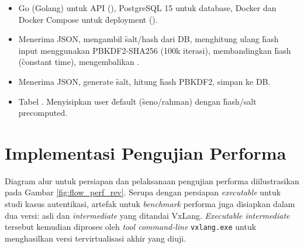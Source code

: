 \begin{itemize}
	\item {} Go (Golang) untuk API (), PostgreSQL 15 untuk database, Docker dan Docker Compose untuk \f{deployment} ().
	\item {} Menerima JSON, mengambil \f{salt/hash} dari DB, menghitung ulang \f{hash} input menggunakan PBKDF2-SHA256 (100k iterasi), membandingkan \f{hash} (\f{constant time}), mengembalikan .
	\item {} Menerima JSON, generate \f{salt}, hitung \f{hash} PBKDF2, simpan ke DB.
	\item {} Tabel . Menyisipkan user \f{default} (\f{seno}/rahman) dengan \f{hash/salt} precomputed.
\end{itemize}

\section{Implementasi Pengujian Performa}
Diagram alur untuk persiapan dan pelaksanaan pengujian performa diilustrasikan pada Gambar \ref{fig:flow_perf_rev}. Serupa dengan persiapan \textit{executable} untuk studi kasus autentikasi, artefak untuk \textit{benchmark} performa juga disiapkan dalam dua versi: asli dan \textit{intermediate} yang ditandai VxLang. \textit{Executable intermediate} tersebut kemudian diproses oleh \textit{tool command-line} \texttt{vxlang.exe} untuk menghasilkan versi tervirtualisasi akhir yang diuji.



